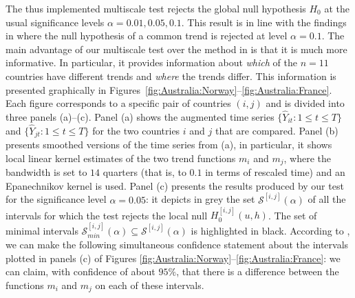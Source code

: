 \documentclass[12pt]{article}
\makeatletter
\renewcommand{\eqref}[1]{\tagform@{\ref{#1}}}
\makeatother
\begin{document}
The thus implemented multiscale test rejects the global null hypothesis $H_0$ at the usual significance levels $\alpha =0.01,0.05, 0.1$. This result is in line with the findings in \cite{Zhang2012} where the null hypothesis of a common trend is rejected at level $\alpha = 0.1$.
The main advantage of our multiscale test over the method in \cite{Zhang2012} is that it is much more informative. In particular, it provides information about \textit{which} of the $n=11$ countries have different trends and \textit{where} the trends differ. This information is presented graphically in Figures~\ref{fig:Australia:Norway}--\ref{fig:Australia:France}. Each figure corresponds to a specific pair of countries $(i, j)$ and is divided into three panels (a)--(c). 
Panel (a) shows the augmented time series $\{\widehat{Y}_{it}: 1 \le t \le T\}$ and $\{\widehat{Y}_{jt}: 1 \le t \le T\}$ for the two countries $i$ and $j$ that are compared. 
Panel (b) presents smoothed versions of the time series from (a), in particular, it shows local linear kernel estimates of the two trend functions $m_i$ and $m_j$, where the bandwidth is set to $14$ quarters (that is, to $0.1$ in terms of rescaled time) and an Epanechnikov kernel is used. Panel (c) presents the results produced by our test for the significance level $\alpha = 0.05$:
it depicts in grey the set $\mathcal{S}^{[i, j]}(\alpha)$ of all the intervals for which the test rejects the local null $H_0^{[i, j]}(u, h)$. The set of minimal intervals $\mathcal{S}^{[i, j]}_{min}(\alpha) \subseteq \mathcal{S}^{[i, j]}(\alpha)$ is highlighted in black. According to \eqref{eq:CS-v2}, we can make the following simultaneous confidence statement about the intervals plotted in panels (c) of Figures \ref{fig:Australia:Norway}--\ref{fig:Australia:France}: we can claim, with confidence of about $95\%$, that there is a difference between the functions $m_i$ and $m_j$ on each of these intervals. 
\end{document}
